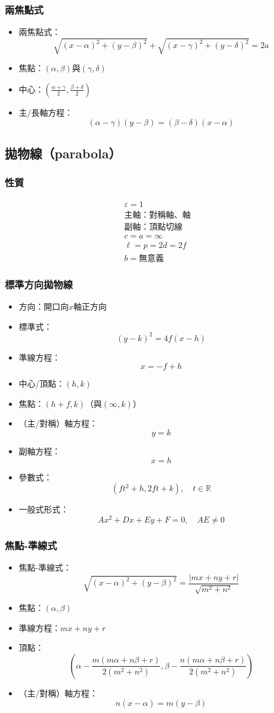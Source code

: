 \documentclass[a4paper,12pt]{article}
\begin{document}
\subsubsection{兩焦點式}
\begin{itemize}
\item 兩焦點式：
\[\sqrt{(x-\alpha)^2+(y-\beta)^2}+\sqrt{(x-\gamma)^2+(y-\delta)^2}=2a\]
\item 焦點：$(\alpha,\beta)$與$(\gamma,\delta)$
\item 中心：$\left(\frac{\alpha+\gamma}{2},\frac{\beta+\delta}{2}\right)$
\item 主/長軸方程：
\[(\alpha-\gamma)(y-\beta)=(\beta-\delta)(x-\alpha)\]
\end{itemize}
\subsection{拋物線（parabola）}
\subsubsection{性質}
\[\begin{aligned}
&\varepsilon=1\\
&\text{主軸：對稱軸、軸}\\
&\text{副軸：頂點切線}\\
&c=a=\infty\\
&\ell=p=2d=2f\\
&b=\text{無意義}
\end{aligned}\]
\subsubsection{標準方向拋物線}
\begin{itemize}
\item 方向：開口向$x$軸正方向
\item 標準式：
\[(y-k)^2=4f(x-h)\]
\item 準線方程：
\[x=-f+h\]
\item 中心/頂點：$(h,k)$
\item 焦點：$(h+f,k)$（與$(\infty,k)$）
\item （主/對稱）軸方程：
\[y=k\]
\item 副軸方程：
\[x=h\]
\item 參數式：
\[(ft^2+h,2ft+k),\quad t\in\mathbb{R}\]
\item 一般式形式：
\[Ax^2+Dx+Ey+F=0,\quad AE\neq 0\]
\end{itemize}
\subsubsection{焦點-準線式}
\begin{itemize}
\item 焦點-準線式：
\[\sqrt{(x-\alpha)^2+(y-\beta)^2}=\frac{|mx+ny+r|}{\sqrt{m^2+n^2}}\]
\item 焦點：$(\alpha,\beta)$
\item 準線方程：$mx+ny+r$
\item 頂點：
\[\left( \alpha - \frac{m(m\alpha + n\beta + r)}{2(m^2+n^2)}, \beta - \frac{n(m\alpha + n\beta + r)}{2(m^2+n^2)} \right)\]
\item （主/對稱）軸方程：
\[n(x-\alpha)=m(y-\beta)\]
\end{itemize}
\end{document}
